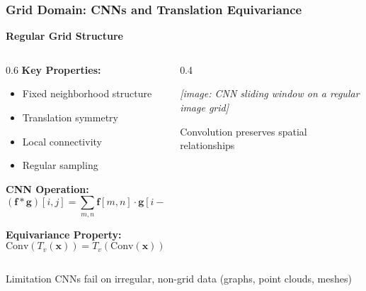 \begin{frame}[fragile]\frametitle{Grid Domain: CNNs and Translation Equivariance}

\begin{center}
\textbf{Regular Grid Structure}
\end{center}

\begin{columns}
\begin{column}{0.6\textwidth}
\textbf{Key Properties:}
\begin{itemize}
\item Fixed neighborhood structure
\item Translation symmetry
\item Local connectivity
\item Regular sampling
\end{itemize}

\textbf{CNN Operation:}
$$(\mathbf{f} * \mathbf{g})[i,j] = \sum_{m,n} \mathbf{f}[m,n] \cdot \mathbf{g}[i-m, j-n]$$

\textbf{Equivariance Property:}
$$\text{Conv}(T_v(\mathbf{x})) = T_v(\text{Conv}(\mathbf{x}))$$
\end{column}
\begin{column}{0.4\textwidth}
\begin{center}
\textit{[image: CNN sliding window on a regular image grid]}

\vspace{0.5cm}
{\small Convolution preserves spatial relationships}
\end{center}
\end{column}
\end{columns}

\begin{alertblock}{Limitation}
CNNs fail on irregular, non-grid data (graphs, point clouds, meshes)
\end{alertblock}

\end{frame}

